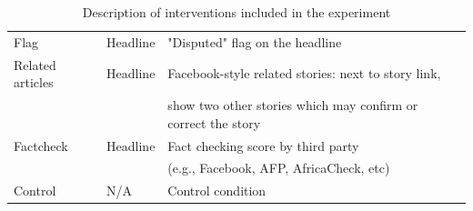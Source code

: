 \documentclass[letterpaper, 12pt, parskip=full,DIV=12]{scrartcl}
\begin{document}
\begin{table}[htb!]
\begin{tabular}{l|l|l}
\\
Flag                                                                                                           & Headline                                                                                                     &  "Disputed" flag on the headline                                                                                                                                                                                                                                                                                                                                                     \\
Related articles                                                                                                       & Headline                                                                                                     & Facebook-style related stories: next to story link,\\ & & show two other stories which may confirm or correct the story                                                                                                                                                                                                                                                                                               \\
Factcheck                                                                                                      & Headline                                                                                                     & Fact checking score by third party\\ & & (e.g., Facebook, AFP, AfricaCheck, etc)
 \\
Control                                                                                                        & N/A                                                                                                          & Control condition                                                                                                                                                                                                                                                                                                                                                                                              
\end{tabular}
\caption{Description of interventions included in the experiment}
\label{tab:treatments}
\end{table}
\end{document}
